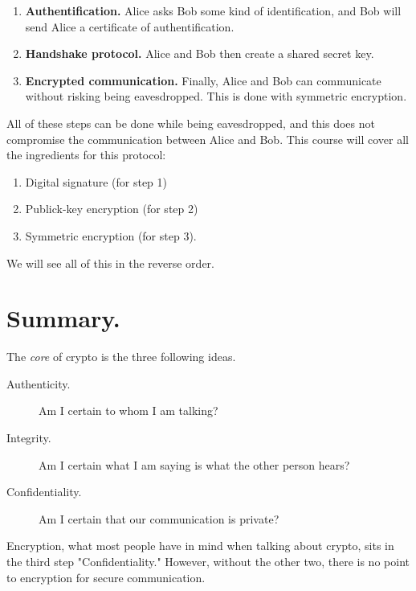 \documentclass[./main]{subfiles}
\begin{document}
  \begin{enumerate}
    \item \textbf{Authentification.}
      Alice asks Bob some kind of identification, and Bob will send Alice a certificate of authentification.
    \item \textbf{Handshake protocol.}
      Alice and Bob then create a shared secret key.
    \item \textbf{Encrypted communication.}
      Finally, Alice and Bob can communicate without risking being eavesdropped.
      This is done with  symmetric encryption.
  \end{enumerate}

  All of these steps can be done while being eavesdropped, and this does not compromise the communication between Alice and Bob.
  This course will cover all the ingredients for this protocol:
  \begin{enumerate}
    \item Digital signature (for step 1)
    \item Publick-key encryption (for step 2)
    \item Symmetric encryption (for step 3).
  \end{enumerate}
  We will see all of this in the reverse order.

  \section{Summary.}

  The \textit{core} of crypto is the three following ideas.
  \begin{description}
    \item[Authenticity.]
      Am I certain to whom I am talking?
    \item[Integrity.] Am I certain what I am saying is what the other person hears?
    \item[Confidentiality.] Am I certain that our communication is private?
  \end{description}

  Encryption, what most people have in mind when talking about crypto, sits in the third step "Confidentiality."
  However, without the other two, there is no point to encryption for secure communication.
\end{document}
